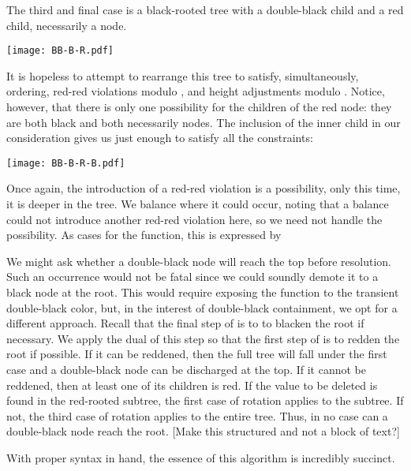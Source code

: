 \documentclass[preprint]{sigplanconf}
\begin{document}
The third and final case is a black-rooted tree with a double-black child and a red child, necessarily a node.
\begin{center}
\texttt{[image: BB-B-R.pdf]}
\end{center}
It is hopeless to attempt to rearrange this tree to satisfy, simultaneously, ordering, red-red violations modulo , and height adjustments modulo . Notice, however, that there is only one possibility for the children of the red node: they are both black and both necessarily nodes. The inclusion of the inner child in our consideration gives us just enough to satisfy all the constraints:
\begin{center}
\texttt{[image: BB-B-R-B.pdf]}
\end{center}
Once again, the introduction of a red-red violation is a possibility, only this time, it is deeper in the tree. We balance where it could occur, noting that a balance could not introduce another red-red violation here, so we need not handle the possibility. As cases for the  function, this is expressed by
\begin{schemedisplay}
[(B (BB? a-w-b) x (R (B c y d) z e))
 (B (balance (B (R (-B a-w-b) x c) y d)) z e)]
[(B (R a w (B b x c)) y (BB? d-z-e))
 (B a w (balance (B b x (R c y (-B d-z-e)))))]
\end{schemedisplay}

We might ask whether a double-black node will reach the top before resolution. Such an occurrence would not be fatal since we could soundly demote it to a black node at the root. This would require exposing the  function to the transient double-black color, but, in the interest of double-black containment, we opt for a different approach. Recall that the final step of  is to to blacken the root if necessary. We apply the dual of this step so that the first step of  is to redden the root if possible. If it can be reddened, then the full tree will fall under the first case and a double-black node can be discharged at the top. If it cannot be reddened, then at least one of its children is red. If the value to be deleted is found in the red-rooted subtree, the first case of rotation applies to the subtree. If not, the third case of rotation applies to the entire tree. Thus, in no case can a double-black node reach the root. [Make this structured and not a block of text?]

With proper syntax in hand, the essence of this algorithm is incredibly succinct.
\end{document}
